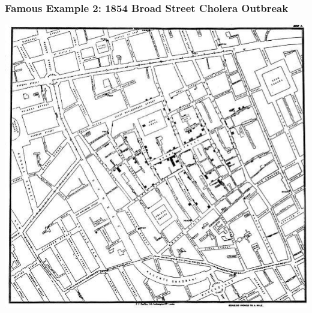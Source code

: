 \documentclass[handout]{beamer}
\begin{document}
\begin{frame}
\frametitle{Famous Example 2:  1854 Broad Street Cholera Outbreak}

\begin{center}
\includegraphics[height=0.8\textheight]{figure/cholera1.png}
\end{center}

\end{frame}
\end{document}
